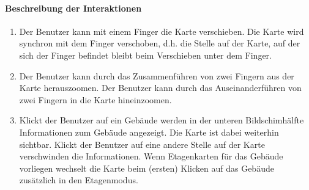 \paragraph{Beschreibung der Interaktionen}
\begin{enumerate}
    \item Der Benutzer kann mit einem Finger die Karte verschieben. Die Karte wird synchron mit dem Finger verschoben, d.h. die Stelle auf der Karte, auf der sich der Finger befindet bleibt beim Verschieben unter dem Finger.
    \item Der Benutzer kann durch das Zusammenführen von zwei Fingern aus der Karte herauszoomen. Der Benutzer kann durch das Auseinanderführen von zwei Fingern in die Karte hineinzoomen.
    \item Klickt der Benutzer auf ein Gebäude werden in der unteren Bildschimhälfte Informationen zum Gebäude angezeigt. Die Karte ist dabei weiterhin sichtbar. Klickt der Benutzer auf eine andere Stelle auf der Karte verschwinden die Informationen. Wenn Etagenkarten für das Gebäude vorliegen wechselt die Karte beim (ersten) Klicken auf das Gebäude zusätzlich in den Etagenmodus.
\end{enumerate}